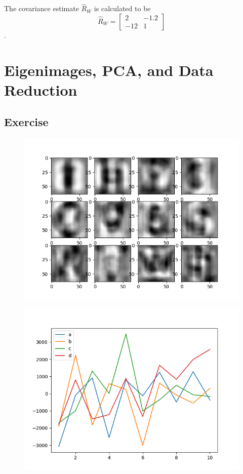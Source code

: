 \documentclass{article}
\begin{document}
The covariance estimate $\hat{R}_W$ is calculated to be
\begin{equation*}
\hat{R}_W = 
\begin{bmatrix}
    2 & -1.2 \\
    -12 & 1
\end{bmatrix}
\end{equation*}.

\section{Eigenimages, PCA, and Data Reduction}
\subsection{Exercise}
\begin{figure}[H]
    \centering
    \includegraphics[width=1\textwidth]{../eigenimages.png}
\end{figure}
\begin{figure}[H]
    \centering
    \includegraphics[width=1\textwidth]{../projection-coefficients.png}
\end{figure}
\end{document}

